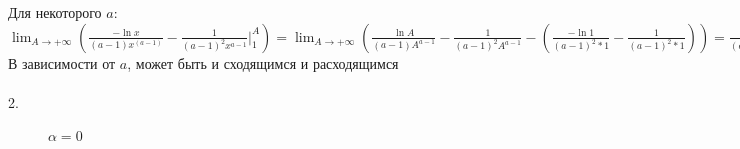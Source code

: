 \documentclass{article}
\begin{document}
Для некоторого $ a $:\\
$ \lim_{A\to +\infty} (\frac{-\ln{x}}{(a-1)x^{(a-1)}} - \frac{1}{(a-1)^2 x^{a-1}} |^A_1) = \lim_{A\to +\infty} (\frac{\ln{A}}{(a-1)A^{a-1}} - \frac{1}{(a-1)^2 A^{a-1}} - (\frac{-\ln{1}}{(a-1)^2 * 1} - \frac{1}{(a-1)^2 * 1})) = \frac{1}{(a-1)^2} $\\
В зависимости от $ a $, может быть и сходящимся и расходящимся\\\\
2. \\
\begin{figure}[h!]
\caption*{$ \alpha = 0 $}
\end{figure}\\
\end{document}
